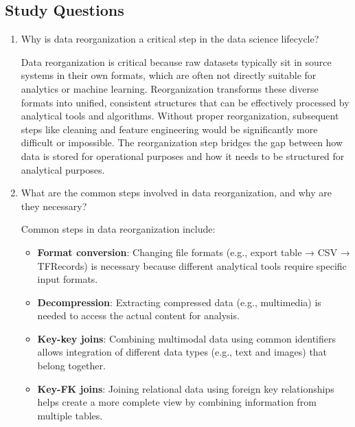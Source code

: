 \documentclass[12pt]{article}
\begin{document}
\subsection{Study Questions}

\begin{enumerate}
    \item Why is data reorganization a critical step in the data science lifecycle?
    
    \begin{tcolorbox}[colback=blue!5!white,colframe=blue!75!black,title={Solution}]
    Data reorganization is critical because raw datasets typically sit in source systems in their own formats, which are often not directly suitable for analytics or machine learning. Reorganization transforms these diverse formats into unified, consistent structures that can be effectively processed by analytical tools and algorithms. Without proper reorganization, subsequent steps like cleaning and feature engineering would be significantly more difficult or impossible. The reorganization step bridges the gap between how data is stored for operational purposes and how it needs to be structured for analytical purposes.
    \end{tcolorbox}
    
    \item What are the common steps involved in data reorganization, and why are they necessary?
    
    \begin{tcolorbox}[colback=blue!5!white,colframe=blue!75!black,title={Solution}]
    Common steps in data reorganization include:
    
    \begin{itemize}
        \item \textbf{Format conversion}: Changing file formats (e.g., export table → CSV → TFRecords) is necessary because different analytical tools require specific input formats.
        
        \item \textbf{Decompression}: Extracting compressed data (e.g., multimedia) is needed to access the actual content for analysis.
        
        \item \textbf{Key-key joins}: Combining multimodal data using common identifiers allows integration of different data types (e.g., text and images) that belong together.
        
        \item \textbf{Key-FK joins}: Joining relational data using foreign key relationships helps create a more complete view by combining information from multiple tables.
    \end{itemize}
    

\end{tcolorbox}
\end{enumerate}
\end{document}
